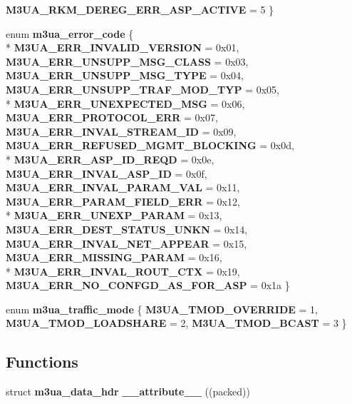 \begin{DoxyCompactItemize}
{\bf M3\+U\+A\+\_\+\+R\+K\+M\+\_\+\+D\+E\+R\+E\+G\+\_\+\+E\+R\+R\+\_\+\+A\+S\+P\+\_\+\+A\+C\+T\+I\+VE} = 5
 \}
\item 
enum {\bf m3ua\+\_\+error\+\_\+code} \{ \\*
{\bf M3\+U\+A\+\_\+\+E\+R\+R\+\_\+\+I\+N\+V\+A\+L\+I\+D\+\_\+\+V\+E\+R\+S\+I\+ON} = 0x01, 
{\bf M3\+U\+A\+\_\+\+E\+R\+R\+\_\+\+U\+N\+S\+U\+P\+P\+\_\+\+M\+S\+G\+\_\+\+C\+L\+A\+SS} = 0x03, 
{\bf M3\+U\+A\+\_\+\+E\+R\+R\+\_\+\+U\+N\+S\+U\+P\+P\+\_\+\+M\+S\+G\+\_\+\+T\+Y\+PE} = 0x04, 
{\bf M3\+U\+A\+\_\+\+E\+R\+R\+\_\+\+U\+N\+S\+U\+P\+P\+\_\+\+T\+R\+A\+F\+\_\+\+M\+O\+D\+\_\+\+T\+YP} = 0x05, 
\\*
{\bf M3\+U\+A\+\_\+\+E\+R\+R\+\_\+\+U\+N\+E\+X\+P\+E\+C\+T\+E\+D\+\_\+\+M\+SG} = 0x06, 
{\bf M3\+U\+A\+\_\+\+E\+R\+R\+\_\+\+P\+R\+O\+T\+O\+C\+O\+L\+\_\+\+E\+RR} = 0x07, 
{\bf M3\+U\+A\+\_\+\+E\+R\+R\+\_\+\+I\+N\+V\+A\+L\+\_\+\+S\+T\+R\+E\+A\+M\+\_\+\+ID} = 0x09, 
{\bf M3\+U\+A\+\_\+\+E\+R\+R\+\_\+\+R\+E\+F\+U\+S\+E\+D\+\_\+\+M\+G\+M\+T\+\_\+\+B\+L\+O\+C\+K\+I\+NG} = 0x0d, 
\\*
{\bf M3\+U\+A\+\_\+\+E\+R\+R\+\_\+\+A\+S\+P\+\_\+\+I\+D\+\_\+\+R\+E\+QD} = 0x0e, 
{\bf M3\+U\+A\+\_\+\+E\+R\+R\+\_\+\+I\+N\+V\+A\+L\+\_\+\+A\+S\+P\+\_\+\+ID} = 0x0f, 
{\bf M3\+U\+A\+\_\+\+E\+R\+R\+\_\+\+I\+N\+V\+A\+L\+\_\+\+P\+A\+R\+A\+M\+\_\+\+V\+AL} = 0x11, 
{\bf M3\+U\+A\+\_\+\+E\+R\+R\+\_\+\+P\+A\+R\+A\+M\+\_\+\+F\+I\+E\+L\+D\+\_\+\+E\+RR} = 0x12, 
\\*
{\bf M3\+U\+A\+\_\+\+E\+R\+R\+\_\+\+U\+N\+E\+X\+P\+\_\+\+P\+A\+R\+AM} = 0x13, 
{\bf M3\+U\+A\+\_\+\+E\+R\+R\+\_\+\+D\+E\+S\+T\+\_\+\+S\+T\+A\+T\+U\+S\+\_\+\+U\+N\+KN} = 0x14, 
{\bf M3\+U\+A\+\_\+\+E\+R\+R\+\_\+\+I\+N\+V\+A\+L\+\_\+\+N\+E\+T\+\_\+\+A\+P\+P\+E\+AR} = 0x15, 
{\bf M3\+U\+A\+\_\+\+E\+R\+R\+\_\+\+M\+I\+S\+S\+I\+N\+G\+\_\+\+P\+A\+R\+AM} = 0x16, 
\\*
{\bf M3\+U\+A\+\_\+\+E\+R\+R\+\_\+\+I\+N\+V\+A\+L\+\_\+\+R\+O\+U\+T\+\_\+\+C\+TX} = 0x19, 
{\bf M3\+U\+A\+\_\+\+E\+R\+R\+\_\+\+N\+O\+\_\+\+C\+O\+N\+F\+G\+D\+\_\+\+A\+S\+\_\+\+F\+O\+R\+\_\+\+A\+SP} = 0x1a
 \}
\item 
enum {\bf m3ua\+\_\+traffic\+\_\+mode} \{ {\bf M3\+U\+A\+\_\+\+T\+M\+O\+D\+\_\+\+O\+V\+E\+R\+R\+I\+DE} = 1, 
{\bf M3\+U\+A\+\_\+\+T\+M\+O\+D\+\_\+\+L\+O\+A\+D\+S\+H\+A\+RE} = 2, 
{\bf M3\+U\+A\+\_\+\+T\+M\+O\+D\+\_\+\+B\+C\+A\+ST} = 3
 \}
\end{DoxyCompactItemize}
\subsection*{Functions}
\begin{DoxyCompactItemize}
\item 
struct {\bf m3ua\+\_\+data\+\_\+hdr} {\bf \+\_\+\+\_\+attribute\+\_\+\+\_\+} ((packed))
\end{DoxyCompactItemize}
